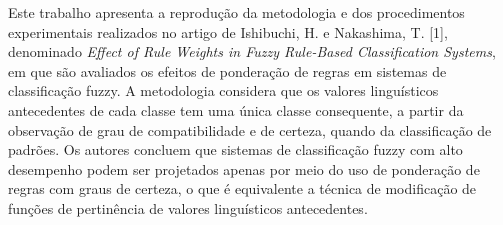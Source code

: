 \documentclass[12pt,a4paper]{article}
\newcommand{\farcm}{\mbox{\ensuremath{.\mkern-4mu^\prime}}}%
\newcommand{\farcs}{\mbox{\ensuremath{.\!\!^{\prime\prime}}}}
\newcommand{\ii }{\'{\i}}
\newcommand{\cc }{\c c}
\newcommand{\cca}{\c ca }
\newcommand{\ao}{\~ao }
\newcommand{\cao}{\c c\~ao }
\newcommand{\oes}{\~oes }
\newcommand{\coes}{\c c\~oes }
\newcommand{\eq}{\begin{equation}}
\newcommand{\feq}{\end{equation}}
\newcommand{\dm}{\begin{displaymath}}
\newcommand{\fdm}{\end{displaymath}}
\newcommand{\eqn}{\begin{eqnarray}}
\newcommand{\feqn}{\end{eqnarray}}
\newcommand{\grau}{^{\circ}}
\newcommand{\ba}{\arrowvert_{t_1}^{t_2}}
\newcommand{\bc}{\arrowvert_{0^{\circ} {\rm C}}^{t_2}}
\newcommand{\bb}{\arrowvert_{0^{\circ} {\rm C}}^{t_1}}
\newcommand{\Ms}{$\mathrm{M}_{\odot}$}
\newcommand{\reg}[1]{#1$^{\tiny{\circledR}}$}
\renewcommand{\baselinestretch}{1.5}
\providecommand{\sin}{} \renewcommand{\sin}{\hspace{2pt}\mathrm{sen}}
\numberwithin{equation}{section}
\begin{document}
%
%

{\abstract
Este trabalho apresenta a reprodução da metodologia e dos procedimentos experimentais realizados no artigo de Ishibuchi, H. e Nakashima, T. [1], denominado \textit{Effect of Rule Weights in Fuzzy Rule-Based Classification Systems}, em que são avaliados os efeitos de ponderação de regras em sistemas de classificação fuzzy. A metodologia considera que os valores linguísticos antecedentes de cada classe tem uma única classe consequente, a partir da observação de grau de compatibilidade e de certeza, quando da classificação de padrões. Os autores concluem que sistemas de classificação fuzzy com alto desempenho podem ser projetados apenas por meio do uso de ponderação de regras com graus de certeza, o que é equivalente a técnica de modificação de funções de pertinência de valores linguísticos antecedentes.}
\newpage
\end{document}
